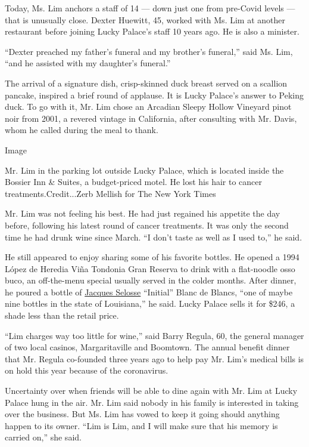 Today, Ms. Lim anchors a staff of 14 --- down just one from pre-Covid
levels --- that is unusually close. Dexter Huewitt, 45, worked with Ms.
Lim at another restaurant before joining Lucky Palace's staff 10 years
ago. He is also a minister.

``Dexter preached my father's funeral and my brother's funeral,'' said
Ms. Lim, ``and he assisted with my daughter's funeral.''

The arrival of a signature dish, crisp-skinned duck breast served on a
scallion pancake, inspired a brief round of applause. It is Lucky
Palace's answer to Peking duck. To go with it, Mr. Lim chose an Arcadian
Sleepy Hollow Vineyard pinot noir from 2001, a revered vintage in
California, after consulting with Mr. Davis, whom he called during the
meal to thank.

Image

Mr. Lim in the parking lot outside Lucky Palace, which is located inside
the Bossier Inn \& Suites, a budget-priced motel. He lost his hair to
cancer treatments.Credit...Zerb Mellish for The New York Times

Mr. Lim was not feeling his best. He had just regained his appetite the
day before, following his latest round of cancer treatments. It was only
the second time he had drunk wine since March. ``I don't taste as well
as I used to,'' he said.

He still appeared to enjoy sharing some of his favorite bottles. He
opened a 1994 López de Heredia Viña Tondonia Gran Reserva to drink with
a flat-noodle osso buco, an off-the-menu special usually served in the
colder months. After dinner, he poured a bottle of
\href{https://www.nytimes3xbfgragh.onion/2008/11/05/dining/05pour.html}{Jacques
Selosse} ``Initial'' Blanc de Blancs, ``one of maybe nine bottles in the
state of Louisiana,'' he said. Lucky Palace sells it for \$246, a shade
less than the retail price.

``Lim charges way too little for wine,'' said Barry Regula, 60, the
general manager of two local casinos, Margaritaville and Boomtown. The
annual benefit dinner that Mr. Regula co-founded three years ago to help
pay Mr. Lim's medical bills is on hold this year because of the
coronavirus.

Uncertainty over when friends will be able to dine again with Mr. Lim at
Lucky Palace hung in the air. Mr. Lim said nobody in his family is
interested in taking over the business. But Ms. Lim has vowed to keep it
going should anything happen to its owner. ``Lim is Lim, and I will make
sure that his memory is carried on,'' she said.

